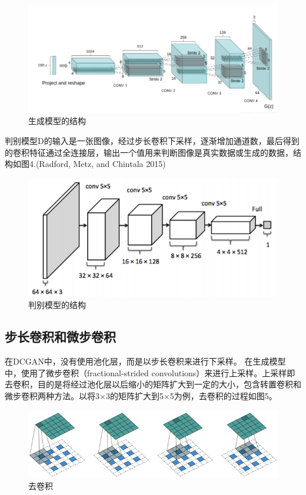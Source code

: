 \documentclass[hyperref, a4paper]{ctexart}
\begin{document}
\begin{figure}
\centering
\includegraphics{3.png}
\caption{生成模型的结构}
\end{figure}

判别模型D的输入是一张图像，经过步长卷积下采样，逐渐增加通道数，最后得到的卷积特征通过全连接层，输出一个值用来判断图像是真实数据或生成的数据，结构如图4.(Radford,
Metz, and Chintala 2015)

\begin{figure}
\centering
\includegraphics{4.png}
\caption{判别模型的结构}
\end{figure}

\hypertarget{ux6b65ux957fux5377ux79efux548cux5faeux6b65ux5377ux79ef}{%
\subsection{步长卷积和微步卷积}\label{ux6b65ux957fux5377ux79efux548cux5faeux6b65ux5377ux79ef}}

在DCGAN中，没有使用池化层，而是以步长卷积来进行下采样。
在生成模型中，使用了微步卷积（fractional-strided
convolutions）来进行上采样。上采样即去卷积，目的是将经过池化层以后缩小的矩阵扩大到一定的大小，包含转置卷积和微步卷积两种方法。以将3×3的矩阵扩大到5×5为例，去卷积的过程如图5。

\begin{figure}
\centering
\includegraphics{./5.png}
\caption{去卷积}
\end{figure}
\end{document}
